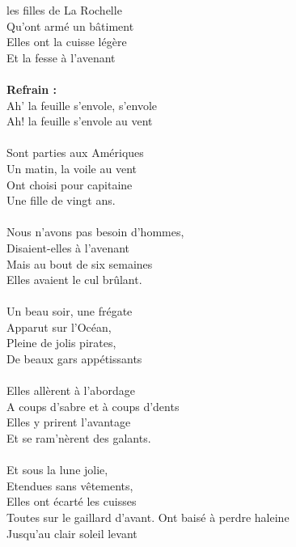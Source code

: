 
 les filles de La Rochelle
\\Qu'ont armé un bâtiment ~~\bissimple
\\Elles ont la cuisse légère
\\Et la fesse à l'avenant
\\\\\textbf{Refrain :}
\\Ah' la feuille s'envole, s'envole
\\Ah! la feuille s'envole au vent
\\\\Sont parties aux Amériques
\\Un matin, la voile au vent~~ \bissimple
\\Ont choisi pour capitaine
\\Une fille de vingt ans.
\\\\Nous n'avons pas besoin d'hommes,
\\Disaient-elles à l'avenant ~~~~~~~~~~~~\bissimple
\\Mais au bout de six semaines
\\Elles avaient le cul brûlant.
\\\\Un beau soir, une frégate
\\Apparut sur l'Océan,~~~~~~ \bissimple
\\Pleine de jolis pirates,
\\De beaux gars appétissants
\\\\Elles allèrent à l'abordage
\\A coups d'sabre et à coups d'dents~ \bissimple
\\Elles y prirent l'avantage
\\Et se ram'nèrent des galants.
\\\\Et sous la lune jolie,
\\Etendues sans vêtements,~~~~~ \bissimple
\\Elles ont écarté les cuisses
\\Toutes sur le gaillard d'avant.
\breakpage
Ont baisé à perdre haleine
\\Jusqu'au clair soleil levant ~\bissimple
